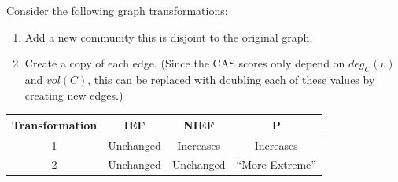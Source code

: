 \documentclass{beamer}
\begin{document}
\begin{frame}{}
Consider the following graph transformations:
    \begin{enumerate}
        \color{darkblue}
        \item Add a new community this is disjoint to the original graph.
        \item Create a copy of each edge. (Since the CAS scores only depend on $deg_C(v)$ and $vol(C)$, this can be replaced with doubling each of these values by creating new edges.)
    \end{enumerate}
    \vspace{1em}
    \begin{table}
        \centering
        \begin{tabular}{c|c|c|c}
            Transformation & IEF & NIEF & P\\ \hline
            1 & Unchanged & Increases & Increases \\
            2 & Unchanged & Unchanged & ``More Extreme''
        \end{tabular}
    \end{table}
\end{frame}

\subtitle{Applications}
\end{document}
